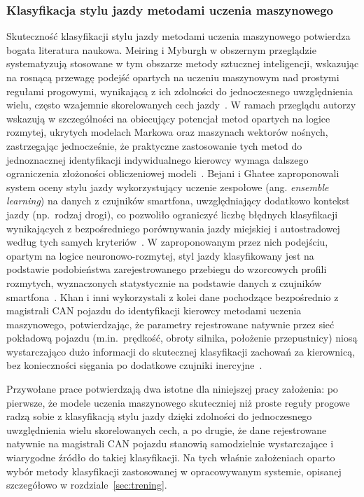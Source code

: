 \subsubsection{Klasyfikacja stylu jazdy metodami uczenia maszynowego}

Skuteczność klasyfikacji stylu jazdy metodami uczenia maszynowego potwierdza bogata
literatura naukowa. Meiring i Myburgh w obszernym przeglądzie systematyzują stosowane
w tym obszarze metody sztucznej inteligencji, wskazując na rosnącą przewagę podejść
opartych na uczeniu maszynowym nad prostymi regułami progowymi, wynikającą z ich
zdolności do jednoczesnego uwzględnienia wielu, często wzajemnie skorelowanych cech
jazdy~\cite{meiring2015}. W ramach przeglądu autorzy wskazują w szczególności na
obiecujący potencjał metod opartych na logice rozmytej, ukrytych modelach Markowa
oraz maszynach wektorów nośnych, zastrzegając jednocześnie, że praktyczne
zastosowanie tych metod do jednoznacznej identyfikacji indywidualnego kierowcy wymaga
dalszego ograniczenia złożoności obliczeniowej modeli~\cite{meiring2015}. Bejani
i Ghatee zaproponowali system oceny stylu jazdy wykorzystujący uczenie zespołowe (ang.
\emph{ensemble learning}) na danych z czujników smartfona, uwzględniający dodatkowo
kontekst jazdy (np.\ rodzaj drogi), co pozwoliło ograniczyć liczbę błędnych klasyfikacji
wynikających z bezpośredniego porównywania jazdy miejskiej i autostradowej według tych
samych kryteriów~\cite{bejani2018}. W zaproponowanym przez nich podejściu, opartym na
logice neuronowo-rozmytej, styl jazdy klasyfikowany jest na podstawie podobieństwa
zarejestrowanego przebiegu do wzorcowych profili rozmytych, wyznaczonych statystycznie
na podstawie danych z czujników smartfona~\cite{bejani2018}. Khan
i inni wykorzystali z kolei dane pochodzące bezpośrednio z magistrali CAN pojazdu do
identyfikacji kierowcy metodami uczenia maszynowego, potwierdzając, że parametry
rejestrowane natywnie przez sieć pokładową pojazdu (m.in.\ prędkość, obroty silnika,
położenie przepustnicy) niosą wystarczająco dużo informacji do skutecznej klasyfikacji
zachowań za kierownicą, bez konieczności sięgania po dodatkowe czujniki
inercyjne~\cite{khan2022}.

Przywołane prace potwierdzają dwa istotne dla niniejszej pracy założenia: po pierwsze,
że modele uczenia maszynowego skuteczniej niż proste reguły progowe radzą sobie
z klasyfikacją stylu jazdy dzięki zdolności do jednoczesnego uwzględnienia wielu
skorelowanych cech, a po drugie, że dane rejestrowane natywnie na magistrali CAN
pojazdu stanowią samodzielnie wystarczające i wiarygodne źródło do takiej klasyfikacji.
Na tych właśnie założeniach oparto wybór metody klasyfikacji zastosowanej
w opracowywanym systemie, opisanej szczegółowo w rozdziale~\ref{sec:trening}.

